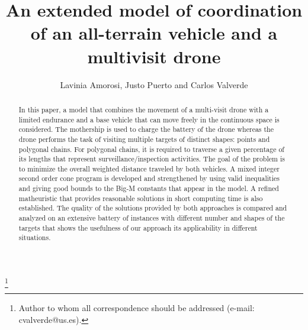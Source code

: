 \documentclass{itor}
\theoremstyle{definition}
\theoremstyle{remark}
\begin{document}

\title{An extended model of coordination of an all-terrain vehicle and a multivisit drone}


\author[Running Author]{Lavinia Amorosi,  Justo Puerto and Carlos Valverde}


\thanks{\affmark{$\ast$}Author to whom all correspondence should be addressed (e-mail: cvalverde@us.es).}


\begin{abstract}
In this paper, a model that combines the movement of a multi-visit drone with a limited endurance and a base vehicle that can move freely in the continuous space is considered. The mothership is used to charge the battery of the drone whereas the drone performs the task of visiting multiple targets of distinct shapes: points and polygonal chains. For polygonal chains, it is required to traverse a given percentage of its lengths that represent surveillance/inspection activities. The goal of the problem is to minimize the overall weighted distance traveled by both vehicles. A mixed integer second order cone program is developed and strengthened by using valid inequalities and giving good bounds to the Big-M constants that appear in the model. A refined matheuristic that provides reasonable solutions in short computing time is also established. The quality of the solutions provided by both approaches is compared and analyzed on an extensive battery of instances with different number and shapes of the targets that shows the usefulness of our approach its applicability in different situations.
\end{abstract}

\end{document}
